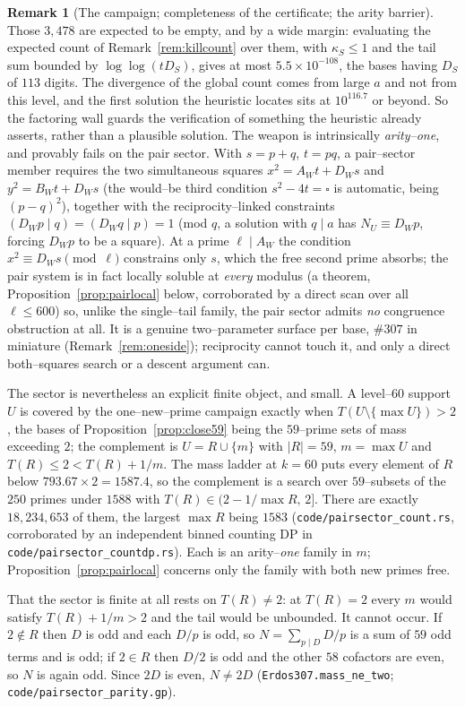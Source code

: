 \documentclass[11pt]{article}
\theoremstyle{definition}
\newtheorem{remark}[theorem]{Remark}
\begin{document}
\begin{remark}[The campaign; completeness of the certificate; the arity barrier]
Those $3{,}478$ are expected to be empty, and by a wide margin: evaluating the expected count of
Remark~\ref{rem:killcount} over them, with $\kappa_S\le1$ and the tail sum bounded by
$\log\log(tD_S)$, gives at most $5.5\times10^{-108}$, the bases having $D_S$ of $113$ digits. The
divergence of the global count comes from large $a$ and not from this level, and the first solution
the heuristic locates sits at $10^{116.7}$ or beyond. So the factoring wall guards the verification of
something the heuristic already asserts, rather than a plausible solution. The weapon is intrinsically \emph{arity--one}, and provably fails on the pair sector. With
$s=p+q$, $t=pq$, a pair--sector member requires the two simultaneous squares $x^2=A_Wt+D_Ws$ and
$y^2=B_Wt+D_Ws$ (the would--be third condition $s^2-4t=\square$ is automatic, being $(p-q)^2$),
together with the reciprocity--linked constraints $(D_Wp\mid q)=(D_Wq\mid p)=1$ (mod $q$, a
solution with $q\mid a$ has $N_U\equiv D_Wp$, forcing $D_Wp$ to be a square). At a prime
$\ell\mid A_W$ the condition $x^2\equiv D_Ws\pmod\ell$ constrains only $s$, which the free second
prime absorbs; the pair system is in fact locally soluble at \emph{every} modulus (a theorem,
Proposition~\ref{prop:pairlocal} below, corroborated by a direct scan over all $\ell\le600$) so,
unlike the single--tail family, the pair sector admits \emph{no} congruence obstruction at all. It
is a genuine two--parameter surface per base, $\#307$ in miniature (Remark~\ref{rem:oneside});
reciprocity cannot touch it, and only a direct both--squares search or a descent argument can.

The sector is nevertheless an explicit finite object, and small. A level--$60$ support $U$ is covered
by the one--new--prime campaign exactly when $T(U\setminus\{\max U\})>2$, the bases of
Proposition~\ref{prop:close59} being the $59$--prime sets of mass exceeding $2$; the complement is
$U=R\cup\{m\}$ with $|R|=59$, $m=\max U$ and $T(R)\le2<T(R)+1/m$. The mass ladder at $k=60$ puts
every element of $R$ below $793.67\times2=1587.4$, so the complement is a search over $59$--subsets
of the $250$ primes under $1588$ with $T(R)\in(2-1/\max R,\,2]$. There are exactly
$18{,}234{,}653$ of them, the largest $\max R$ being $1583$ \textup{(\texttt{code/pairsector\_count.rs},
corroborated by an independent binned counting DP in \texttt{code/pairsector\_countdp.rs})}. Each is
an arity--\emph{one} family in $m$; Proposition~\ref{prop:pairlocal} concerns only the family with both new primes free.

That the sector is finite at all rests on $T(R)\ne2$: at $T(R)=2$ every $m$ would satisfy
$T(R)+1/m>2$ and the tail would be unbounded. It cannot occur. If $2\notin R$ then $D$ is odd and each
$D/p$ is odd, so $N=\sum_{p\mid D}D/p$ is a sum of $59$ odd terms and is odd; if $2\in R$ then $D/2$
is odd and the other $58$ cofactors are even, so $N$ is again odd. Since $2D$ is even, $N\ne2D$
\textup{(\texttt{Erdos307.mass\_ne\_two}; \texttt{code/pairsector\_parity.gp})}.


\end{remark}
\end{document}
